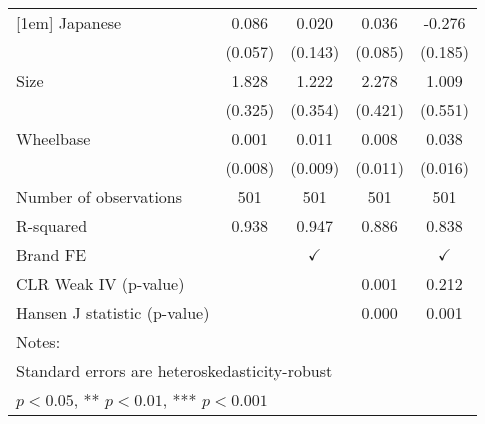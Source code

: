 \begin{table}[htbp]
\begin{tabular}{l*{4}{c}}
        [1em]
        Japanese                                   & 0.086                                              & 0.020           & 0.036           & -0.276           \\
                                                   & (0.057)                                            & (0.143)         & (0.085)         & (0.185)          \\
        [1em]
        Size                                       & 1.828\sym{***}                                     & 1.222\sym{***}  & 2.278\sym{***}  & 1.009\sym{*}     \\
                                                   & (0.325)                                            & (0.354)         & (0.421)         & (0.551)          \\
        [1em]
        Wheelbase                                  & 0.001                                              & 0.011           & 0.008           & 0.038\sym{**}    \\
                                                   & (0.008)                                            & (0.009)         & (0.011)         & (0.016)          \\
        [1em]
        \hline
        Number of observations                     & 501                                                & 501             & 501             & 501              \\
        R-squared                                  & 0.938                                              & 0.947           & 0.886           & 0.838            \\
        Brand FE                                   &                                                    & $\checkmark$    &                 & $\checkmark$     \\
        CLR Weak IV (p-value)                      &                                                    &                 & 0.001           & 0.212            \\
        Hansen J statistic (p-value)               &                                                    &                 & 0.000           & 0.001            \\
        \hline\hline
        \multicolumn{5}{l}{\footnotesize Notes:}                                                                                                               \\
        \multicolumn{5}{l}{\footnotesize Standard errors are heteroskedasticity-robust}                                                                        \\
        \multicolumn{5}{l}{\footnotesize * $ p < 0.05$, ** $ p < 0.01$, *** $ p < 0.001$}                                                                      \\
    \end{tabular}
\end{table}
